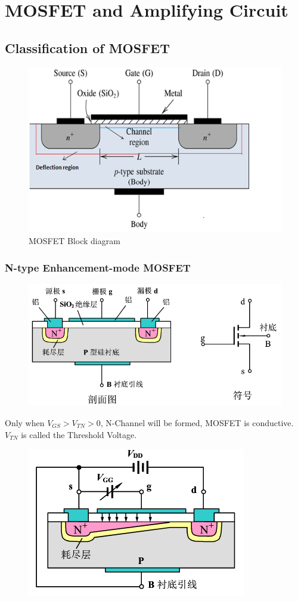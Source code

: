 \chapter{MOSFET and Amplifying Circuit}

\section{Classification of MOSFET}

\begin{figure}[H]
  \centering
  \includegraphics[width=0.5\linewidth]{figures/MOSFET-BLOCK-DIAGRAM.png}
  \caption{MOSFET Block diagram}
  \label{fig:}
\end{figure}

\subsection{N-type Enhancement-mode MOSFET}

\begin{figure}[H]
  \centering
  \includegraphics[width=0.7\linewidth]{figures/ENMOS}
  \label{fig:}
\end{figure}

Only when $V_{GS} > V_{TN} > 0$, N-Channel will be formed, MOSFET is conductive. $V_{TN}$ is called the Threshold Voltage.

\begin{figure}[H]
  \centering
  \includegraphics[width=0.5\linewidth]{figures/ENMOS2}
  \label{fig:}
\end{figure}

